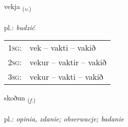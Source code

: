 \documentclass[frontgrid, backgrid]{flacards}\usepackage[]{graphicx}\usepackage[]{xcolor}
\begin{document}
\renewcommand{\blhead}{\vskip5pt {\small\bfseries\footnotesize Sagnorð | Verb }}
\renewcommand{\bcfoot}{\vskip5pt \hspace{2pt}{\small\bfseries\footnotesize 1K}}


{vekja \small{\textsubscript{(\textit{v.})}} \\[1ex] %
\textphonetic{[vɛːca]} \\
pl.: \emph{budzić} \\  [2ex]
\renewcommand*{\arraystretch}{0.8}
\begin{tabular}{p{1cm}l}
\textsc{1sg}: & vek -- vakti -- vakið \\ 
\textsc{2sg}: & vekur -- vaktir -- vakið \\ 
\textsc{3sg}: & vekur -- vakti -- vakið \\ 
\end{tabular}
}

\renewcommand{\flhead}{\vskip5pt \fboxsep=0pt {\small\bfseries\footnotesize Nafnorð | Noun}}
\renewcommand{\fcfoot}{\vskip5pt \fboxsep=0pt \hspace{2pt}{\small\bfseries\footnotesize 1K}}

\renewcommand{\blhead}{\vskip5pt {\small\bfseries\footnotesize Nafnorð | Noun }}
\renewcommand{\bcfoot}{\vskip5pt \hspace{2pt}{\small\bfseries\footnotesize 1K}}


{skoðun \small{\textsubscript{(\textit{f.})}} \\[1ex] %
\textphonetic{[skɔːðʏn]} \\
pl.: \emph{opinia, zdanie; obserwacje; badanie} \\  [2ex]
\renewcommand*{\arraystretch}{0.8}
}

\renewcommand{\flhead}{\vskip5pt \fboxsep=0pt {\small\bfseries\footnotesize Nafnorð | Noun}}
\renewcommand{\fcfoot}{\vskip5pt \fboxsep=0pt \hspace{2pt}{\small\bfseries\footnotesize 1K}}
\end{document}
